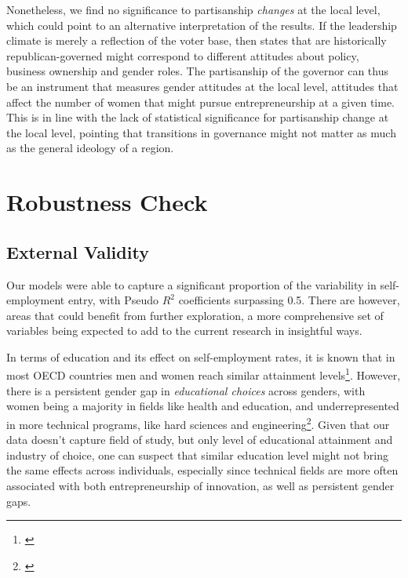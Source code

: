 Nonetheless, we find no significance to partisanship \textit{changes} at the local level, which could point to an alternative interpretation of the results. If the leadership climate is merely a reflection of the voter base, then states that are historically republican-governed might correspond to different attitudes about policy, business ownership and gender roles. The partisanship of the governor can thus be an instrument that measures gender attitudes at the local level, attitudes that affect the number of women that might pursue entrepreneurship at a given time. This is in line with the lack of statistical significance for partisanship change at the local level, pointing that transitions in governance might not matter as much as the general ideology of a region.

\section{Robustness Check}

\subsection{External Validity}

Our models were able to capture a significant proportion of the variability in self-employment entry, with Pseudo $R^2$ coefficients surpassing 0.5. There are however, areas that could benefit from further exploration, a more comprehensive set of variables being expected to add to the current research in insightful ways. 

In terms of education and its effect on self-employment rates, it is known that in most OECD countries men and women reach similar attainment levels\footnote{\cite{charles2002equal}}. However, there is a persistent gender gap in \textit{educational choices} across genders, with women being a majority in fields like health and education, and underrepresented in more technical programs, like hard sciences and engineering\footnote{\cite{charles2002equal}}. Given that our data doesn't capture field of study, but only level of educational attainment and industry of choice, one can suspect that similar education level might not bring the same effects across individuals, especially since technical fields are more often associated with both entrepreneurship of innovation, as well as persistent gender gaps. 

